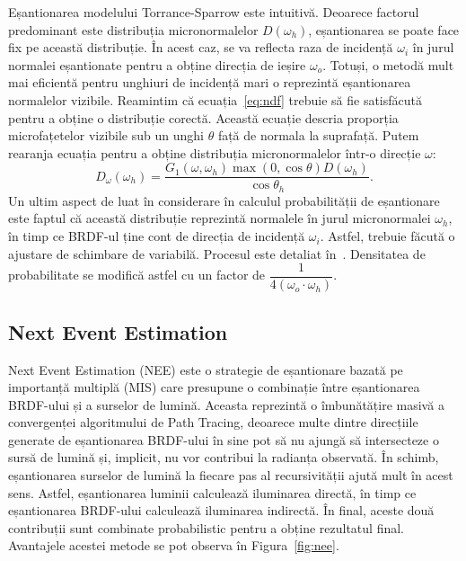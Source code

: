 \documentclass[12pt,a4paper]{report}
\numberwithin{equation}{section} %
\begin{document}
Eșantionarea modelului Torrance-Sparrow este intuitivă. Deoarece factorul
predominant este distribuția micronormalelor $D(\omega_h)$, eșantionarea
se poate face fix pe această distribuție. În acest caz, se va reflecta
raza de incidență $\omega_i$ în jurul normalei eșantionate pentru a obține
direcția de ieșire $\omega_o$. Totuși, o metodă mult mai eficientă pentru
unghiuri de incidență mari o reprezintă eșantionarea normalelor vizibile.
Reamintim că ecuația~\ref{eq:ndf} trebuie să fie satisfăcută pentru a obține
o distribuție corectă. Această ecuație descria proporția microfațetelor vizibile
sub un unghi $\theta$ față de normala la suprafață. Putem rearanja ecuația
pentru a obține distribuția micronormalelor într-o direcție $\omega$:
\begin{equation}
	D_{\omega}(\omega_h) = \frac{G_1(\omega, \omega_h)\max(0, \cos \theta)D(\omega_h)}{\cos \theta_h}.
\end{equation}
Un ultim aspect de luat în considerare în calculul probabilității de eșantionare
este faptul că această distribuție reprezintă normalele în jurul micronormalei $\omega_h$,
în timp ce BRDF-ul ține cont de direcția de incidență $\omega_i$. Astfel, trebuie făcută
o ajustare de schimbare de variabilă. Procesul este detaliat în~\cite{PbrBookNdf}.
Densitatea de probabilitate se modifică astfel cu un factor de $\dfrac{1}{4(\omega_o \cdot \omega_h)}$.

\subsection{Next Event Estimation}

Next Event Estimation (NEE) este o strategie de eșantionare bazată pe importanță
multiplă (MIS) care presupune o combinație între eșantionarea BRDF-ului și a
surselor de lumină. Aceasta reprezintă o îmbunătățire masivă a convergenței
algoritmului de Path Tracing, deoarece multe dintre direcțiile generate de
eșantionarea BRDF-ului în sine pot să nu ajungă să intersecteze o sursă de lumină
și, implicit, nu vor contribui la radianța observată. În schimb, eșantionarea
surselor de lumină la fiecare pas al recursivității ajută mult în acest sens.
Astfel, eșantionarea luminii calculează iluminarea directă, în timp ce eșantionarea
BRDF-ului calculează iluminarea indirectă. În final, aceste două contribuții
sunt combinate probabilistic pentru a obține rezultatul final. Avantajele acestei
metode se pot observa în Figura~\ref{fig:nee}.
\end{document}
